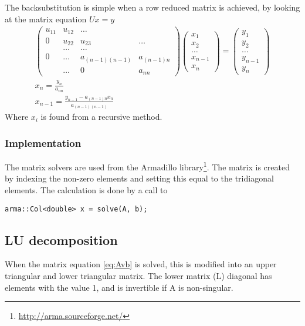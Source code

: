 \documentclass[11pt,a4paper,english,final]{article}
\numberwithin{equation}{section}
\begin{document}
The backsubstitution is simple when a row reduced matrix is achieved,
by looking at the matrix equation $Ux = y$
\begin{gather}
\begin{pmatrix} u_{11} & u_{12} & \dots\\
                0 & u_{22} & u_{23} & \dots\\
                &\dots & \dots\\
                0 & \dots & a_{(n-1)(n-1)} & a_{(n-1)n} \\
                & \dots & 0 & a_{nn}
\end{pmatrix} \begin{pmatrix} x_1 \\ x_2 \\ \dots \\ x_{n-1}\\ x_n \end{pmatrix}
 = \begin{pmatrix} y_1 \\ y_2 \\ \dots\\ y_{n-1} \\ y_n \end{pmatrix}\\
 x_n = \frac{y_n}{a_{nn}}\\
 x_{n-1} = \frac{y_{n-1} - a_{(n-1)n}x_n}{a_{(n-1)(n-1)}}
\end{gather}
Where $x_{i}$ is found from a recursive method.

\subsubsection{Implementation}
\label{subsubsec:impl_gauss}
The matrix solvers are used from the Armadillo 
library\footnote{\url{http://arma.sourceforge.net/}}. The matrix is
created by indexing the non-zero elements and setting this equal to the 
tridiagonal elements. The calculation is done by a call to 
\begin{lstlisting}
arma::Col<double> x = solve(A, b);
\end{lstlisting}


\subsection{LU decomposition}

When the matrix equation \eqref{eq:Avb} is solved, this is modified into
an upper triangular and lower triangular matrix. The lower matrix (L) 
diagonal has elements with the value 1, and is invertible if A is 
non-singular.
\end{document}
